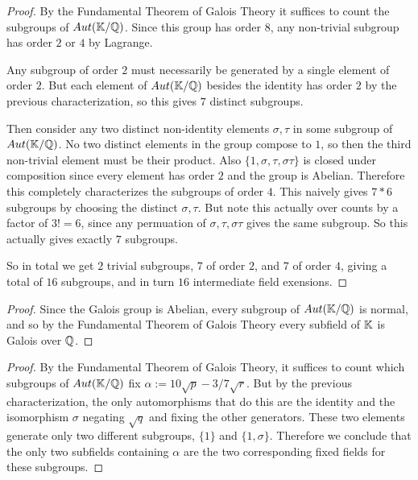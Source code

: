 \documentclass[11pt]{article}
\begin{document}
\begin{proof}
  By the Fundamental Theorem of Galois Theory it suffices to count the subgroups of $Aut(\mathbb{K}/\mathbb{Q})$.
  Since this group has order $8$, any non-trivial subgroup has order $2$ or $4$ by Lagrange.

  Any subgroup of order $2$ must necessarily be generated by a single element of order $2$.
  But each element of $Aut(\mathbb{K}/\mathbb{Q})$ besides the identity has order $2$ by the previous characterization, so this gives $7$ distinct subgroups.

  Then consider any two distinct non-identity elements $\sigma,\tau$ in some subgroup of $Aut(\mathbb{K}/\mathbb{Q})$.
  No two distinct elements in the group compose to $1$, so then the third non-trivial element must be their product.
  Also $\{1, \sigma, \tau, \sigma\tau\}$ is closed under composition since every element has order $2$ and the group is Abelian.
  Therefore this completely characterizes the subgroups of order $4$.
  This naively gives $7*6$ subgroups by choosing the distinct $\sigma, \tau$.
  But note this actually over counts by a factor of $3! = 6$, since any permuation of $\sigma, \tau, \sigma\tau$ gives the same subgroup.
  So this actually gives exactly $7$ subgroups.

  So in total we get $2$ trivial subgroups, $7$ of order $2$, and $7$ of order $4$, giving a total of $16$ subgroups, and in turn $16$ intermediate field exensions.
\end{proof}

\begin{proof}
  Since the Galois group is Abelian, every subgroup of $Aut(\mathbb{K}/\mathbb{Q})$ is normal, and so by the Fundamental Theorem of Galois Theory every subfield of $\mathbb{K}$ is Galois over $\mathbb{Q}$.
\end{proof}

\begin{proof}
  By the Fundamental Theorem of Galois Theory, it suffices to count which subgroups of $Aut(\mathbb{K}/\mathbb{Q})$ fix $\alpha := 10\sqrt{p}-3/7\sqrt{r}$.
  But by the previous characterization, the only automorphisms that do this are the identity and the isomorphism $\sigma$ negating $\sqrt{q}$ and fixing the other generators.
  These two elements generate only two different subgroups, $\{1\}$ and $\{1,\sigma\}$.
  Therefore we conclude that the only two subfields containing $\alpha$ are the two corresponding fixed fields for these subgroups.
\end{proof}
\end{document}
